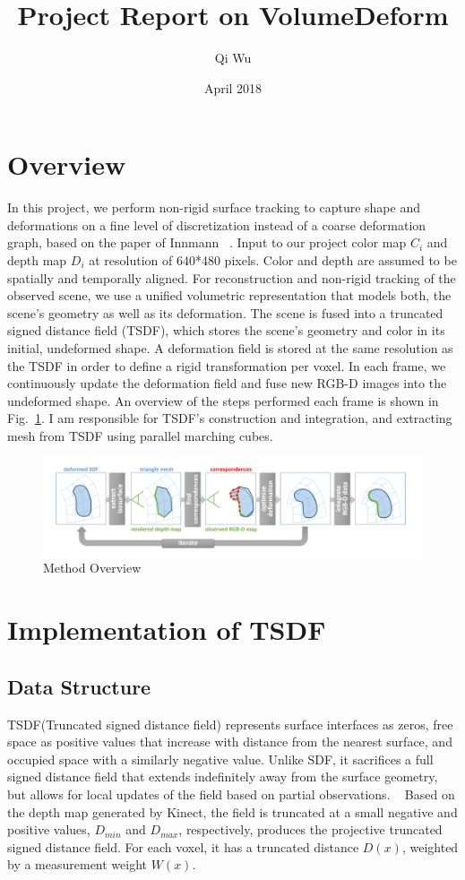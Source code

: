\documentclass{article}
\title{Project Report on VolumeDeform}
\author{Qi Wu }
\date{April 2018}
\begin{document}
\maketitle

\section{Overview}
In this project, we perform non-rigid surface tracking to capture shape and deformations on a fine level of discretization instead of a coarse deformation graph, based on the paper of Innmann ~\cite{innmann2016volumedeform}. Input to our project color map $C_i$ and depth map $D_i$ at resolution of 640*480 pixels. Color and depth are assumed to be spatially and temporally aligned. For reconstruction and non-rigid tracking of the observed scene, we use a unified volumetric representation that models both, the scene’s geometry as well as its deformation. The scene is fused into a truncated signed distance field (TSDF), which stores the scene’s geometry and color in its initial, undeformed shape. A deformation field is stored at the same resolution as the TSDF in order to define a rigid transformation per voxel. In each frame, we continuously update the deformation field and fuse new RGB-D images into the undeformed shape. An overview of the steps performed each frame is shown in Fig.~\ref{fig:pipeline}. I am responsible for TSDF's construction and integration, and extracting mesh from TSDF using parallel marching cubes.
\begin{figure}[htp]
\centering
\includegraphics[width=12cm]{figures/pipeline.png}
\caption{Method Overview}
\label{fig:pipeline}
\end{figure}


\section{Implementation of TSDF}
\subsection{Data Structure}
TSDF(Truncated signed distance field) represents surface interfaces as zeros, free space as positive values that increase with distance from the nearest surface, and occupied space with a similarly negative value. Unlike SDF, it sacrifices a full signed distance field that extends indefinitely away from the surface geometry, but allows for local updates of the field based on partial observations. ~\cite{CanelhasDanielRicao2017Tsdf} Based on the depth map generated by Kinect, the field is truncated at a small negative and positive values, $D_{min}$ and $D_{max}$, respectively, produces the projective truncated signed distance field. For each voxel, it has a truncated distance $D{(x)}$, weighted by a measurement weight $W{(x)}$.
\end{document}
